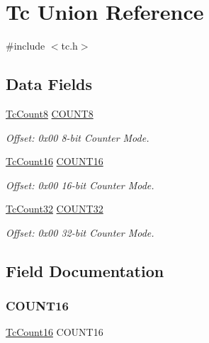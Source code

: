 \hypertarget{union_tc}{}\section{Tc Union Reference}
\label{union_tc}


{\ttfamily \#include $<$tc.\+h$>$}

\subsection*{Data Fields}
\begin{DoxyCompactItemize}
\item 
\mbox{\hyperlink{struct_tc_count8}{Tc\+Count8}} \mbox{\hyperlink{union_tc_a33c60e7050dc98bb9c39fcc85f79b989}{C\+O\+U\+N\+T8}}
\begin{DoxyCompactList}\small\item\em Offset\+: 0x00 8-\/bit Counter Mode. \end{DoxyCompactList}\item 
\mbox{\hyperlink{struct_tc_count16}{Tc\+Count16}} \mbox{\hyperlink{union_tc_aaefc8f4593a51d83150fd61ab1162632}{C\+O\+U\+N\+T16}}
\begin{DoxyCompactList}\small\item\em Offset\+: 0x00 16-\/bit Counter Mode. \end{DoxyCompactList}\item 
\mbox{\hyperlink{struct_tc_count32}{Tc\+Count32}} \mbox{\hyperlink{union_tc_a2d1c2f02ca49d2a99e8954083cddb9f7}{C\+O\+U\+N\+T32}}
\begin{DoxyCompactList}\small\item\em Offset\+: 0x00 32-\/bit Counter Mode. \end{DoxyCompactList}\end{DoxyCompactItemize}


\subsection{Field Documentation}
\mbox{\label{union_tc_aaefc8f4593a51d83150fd61ab1162632}} 
\subsubsection{\texorpdfstring{COUNT16}{COUNT16}}
{\footnotesize\ttfamily \mbox{\hyperlink{struct_tc_count16}{Tc\+Count16}} C\+O\+U\+N\+T16}



